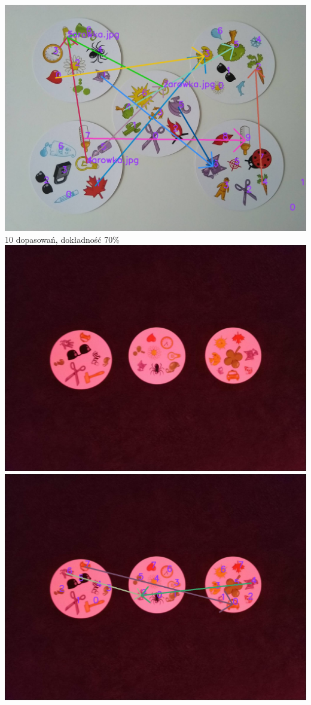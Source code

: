 \documentclass[10pt,a4paper]{article}
\begin{document}
\begin{center}
\includegraphics[scale=0.28]{hard/img_arrows3.jpg}\\
10 dopasowań, dokładność 70\%
\includegraphics[scale=0.28]{hard/dobble16.jpg}
\includegraphics[scale=0.28]{hard/img_arrows5.jpg}\\

\end{center}
\end{document}
